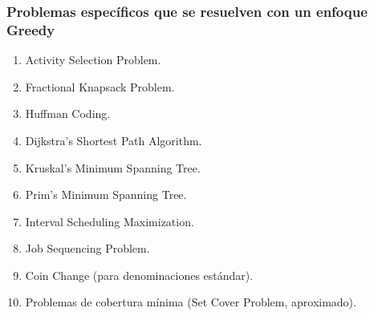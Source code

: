 \subsubsection{Problemas específicos que se resuelven con un enfoque Greedy}  
\begin{enumerate}  
  \item Activity Selection Problem.  
  \item Fractional Knapsack Problem.  
  \item Huffman Coding.  
  \item Dijkstra’s Shortest Path Algorithm.  
  \item Kruskal’s Minimum Spanning Tree.  
  \item Prim’s Minimum Spanning Tree.  
  \item Interval Scheduling Maximization.  
  \item Job Sequencing Problem.  
  \item Coin Change (para denominaciones estándar).  
  \item Problemas de cobertura mínima (Set Cover Problem, aproximado).  
\end{enumerate} 

